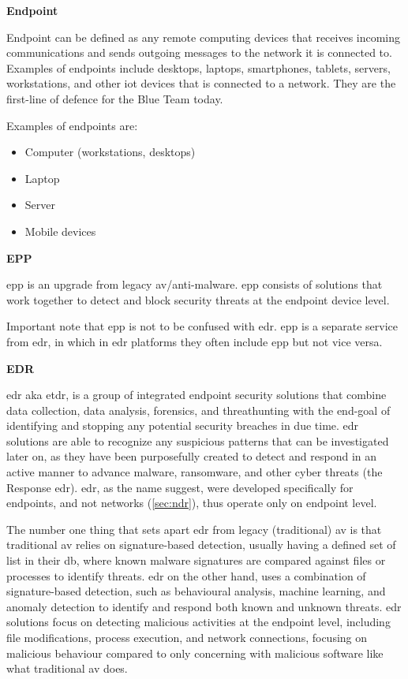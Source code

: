 \begin{multicols}{2}
      \textbf{Endpoint}

      Endpoint can be defined as any remote computing devices that receives incoming communications and sends outgoing messages
      to the network it is connected to. Examples of endpoints include desktops, laptops, smartphones, tablets, servers, workstations,
      and other \acrshort{iot} devices that is connected to a network. They are the first-line of defence for the Blue Team today.

      Examples of endpoints are:
      \begin{itemize}
            \item Computer (workstations, desktops)
            \item Laptop
            \item Server
            \item Mobile devices
      \end{itemize}

      \textbf{EPP}

      \acrshort{epp} is an upgrade from legacy \acrshort{av}/anti-malware. \acrshort{epp} consists of solutions that work together to detect
      and block security threats at the endpoint device level.

      Important note that \acrshort{epp} is not to be confused with \acrshort{edr}. \acrshort{epp} is a separate service from \acrshort{edr},
      in which in \acrshort{edr} platforms they often include \acrshort{epp} but not vice versa.

      \textbf{EDR}

      \acrshort{edr} \acrshort{aka} \acrshort{etdr}, is a group of integrated endpoint security solutions that combine data collection,
      data analysis, forensics, and \gls{threathunting} with the end-goal of identifying and stopping any potential security breaches in due
      time. \acrshort{edr} solutions are able to recognize any suspicious patterns that can be investigated later on, as they have been
      purposefully created to detect and respond in an active manner to advance malware, ransomware, and other cyber threats (the Response
      \acrshort{edr}). \acrshort{edr}, as the name suggest, were developed specifically for endpoints, and not networks (\ref{sec:ndr}), thus
      operate only on endpoint level.

      The number one thing that sets apart \acrshort{edr} from legacy (traditional) \acrshort{av} is that traditional \acrshort{av} relies on
      signature-based detection, usually having a defined set of list in their \acrshort{db}, where known malware signatures are compared
      against files or processes to identify threats. \acrshort{edr} on the other hand, uses a combination of signature-based detection, such
      as behavioural analysis, machine learning, and anomaly detection to identify and respond both known and unknown threats. \acrshort{edr}
      solutions focus on detecting malicious activities at the endpoint level, including file modifications, process execution, and network
      connections, focusing on malicious behaviour compared to only concerning with malicious software like what traditional \acrshort{av} does.


\end{multicols}
